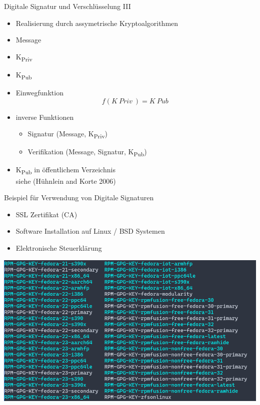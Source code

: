 \documentclass[
  9pt,
  ignorenonframetext,
  aspectratio=169,
]{beamer}
\providecommand{\tightlist}{%
  \setlength{\itemsep}{0pt}\setlength{\parskip}{0pt}}
\begin{document}
\begin{frame}{Digitale Signatur und Verschlüsselung III}
\protect\hypertarget{digitale-signatur-und-verschluxfcsselung-iii}{}
\begin{itemize}
\item
  Realisierung durch assymetrische Kryptoalgorithmen
\item
  Message
\item
  K\textsubscript{Priv}
\item
  K\textsubscript{Pub}
\item
  Einwegfunktion \[f(K~Priv~) = K~Pub~\]
\item
  inverse Funktionen

  \begin{itemize}
  \tightlist
  \item
    Signatur (Message, K\textsubscript{Priv})
  \item
    Verifikation (Message, Signatur, K\textsubscript{Pub})
  \end{itemize}
\item
  K\textsubscript{Pub} in öffentlichem Verzeichnis\\
  siehe (Hühnlein and Korte 2006)
\end{itemize}
\end{frame}

\begin{frame}{Beispiel für Verwendung von Digitale Signaturen}
\protect\hypertarget{beispiel-fuxfcr-verwendung-von-digitale-signaturen}{}
\begin{itemize}
\tightlist
\item
  SSL Zertifikat (CA)
\item
  Software Installation auf Linux / BSD Systemen
\item
  Elektronische Steuerklärung
\end{itemize}

\includegraphics[width=\textwidth,height=0.6\textheight]{Abbildungen/GPG.png}
\end{frame}
\end{document}
